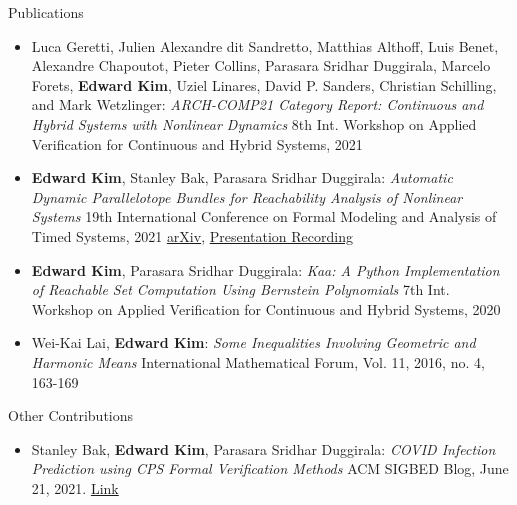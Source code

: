 \documentclass{resume} %
\begin{document}
\begin{rSection}{Publications}
  \begin{itemize}
    \item  Luca Geretti, Julien Alexandre dit Sandretto, Matthias Althoff, Luis Benet, Alexandre Chapoutot, Pieter Collins, Parasara Sridhar Duggirala, Marcelo Forets, {\bf Edward Kim}, Uziel Linares, David P. Sanders, Christian Schilling, and Mark Wetzlinger: \newline
    \textit{ARCH-COMP21 Category Report: Continuous and Hybrid Systems with Nonlinear Dynamics} \newline
    8th Int. Workshop on Applied Verification for Continuous and Hybrid Systems, 2021

    \item {\bf Edward Kim}, Stanley Bak, Parasara Sridhar Duggirala: \newline
    \textit{Automatic Dynamic Parallelotope Bundles for Reachability Analysis of Nonlinear Systems} \newline
    19th International Conference on Formal Modeling and Analysis of Timed Systems, 2021 \newline
    \href{https://arxiv.org/abs/2105.11796}{arXiv}, \href{https://www.youtube.com/watch?v=YKyXf3_O5XM)}{Presentation Recording}

    \item {\bf Edward Kim}, Parasara Sridhar Duggirala: \newline
    \textit{Kaa: A Python Implementation of Reachable Set Computation Using Bernstein Polynomials} \newline
    7th Int. Workshop on Applied Verification for Continuous and Hybrid Systems, 2020

    \item Wei-Kai Lai, {\bf Edward Kim}: \newline
    \textit{Some Inequalities Involving Geometric and Harmonic Means} \newline
    International Mathematical Forum, Vol. 11, 2016, no. 4, 163-169
  \end{itemize}
\end{rSection}

\begin{rSection}{Other Contributions}
  \begin{itemize}
    \item Stanley Bak, {\bf Edward Kim}, Parasara Sridhar Duggirala: \newline
    \textit{COVID Infection Prediction using CPS Formal Verification Methods} \newline
    ACM SIGBED Blog, June 21, 2021. \href{https://sigbed.org/2021/06/21/sidbed-blog-covid-formal-verification/}{Link}
  \end{itemize}
\end{rSection}
\end{document}
